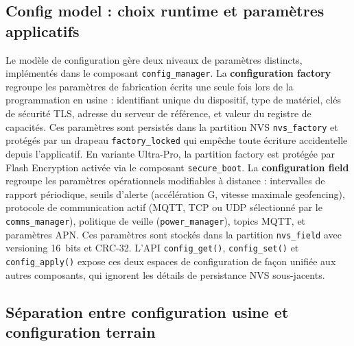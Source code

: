 \subsection{Config model : choix runtime et paramètres applicatifs}
\label{subsec:config_model}

Le modèle de configuration gère deux niveaux de paramètres distincts,
implémentés dans le composant \texttt{config\_manager}. La
\textbf{configuration factory} regroupe les paramètres de fabrication
écrits une seule fois lors de la programmation en usine : identifiant
unique du dispositif, type de matériel, clés de sécurité TLS, adresse
du serveur de référence, et valeur du registre de capacités. Ces
paramètres sont persistés dans la partition NVS \texttt{nvs\_factory}
et protégés par un drapeau \texttt{factory\_locked} qui empêche toute
écriture accidentelle depuis l'applicatif. En variante Ultra-Pro, la
partition factory est protégée par Flash Encryption activée via le
composant \texttt{secure\_boot}. La \textbf{configuration field}
regroupe les paramètres opérationnels modifiables à distance :
intervalles de rapport périodique, seuils d'alerte (accélération G,
vitesse maximale geofencing), protocole de communication actif (MQTT,
TCP ou UDP sélectionné par le \texttt{comms\_manager}), politique de
veille (\texttt{power\_manager}), topics MQTT, et paramètres APN. Ces
paramètres sont stockés dans la partition \texttt{nvs\_field} avec
versioning 16~bits et CRC-32. L'API \texttt{config\_get()},
\texttt{config\_set()} et \texttt{config\_apply()} expose ces deux
espaces de configuration de façon unifiée aux autres composants, qui
ignorent les détails de persistance NVS sous-jacents.

\subsection{Séparation entre configuration usine et configuration terrain}
\label{subsec:sep_config}

